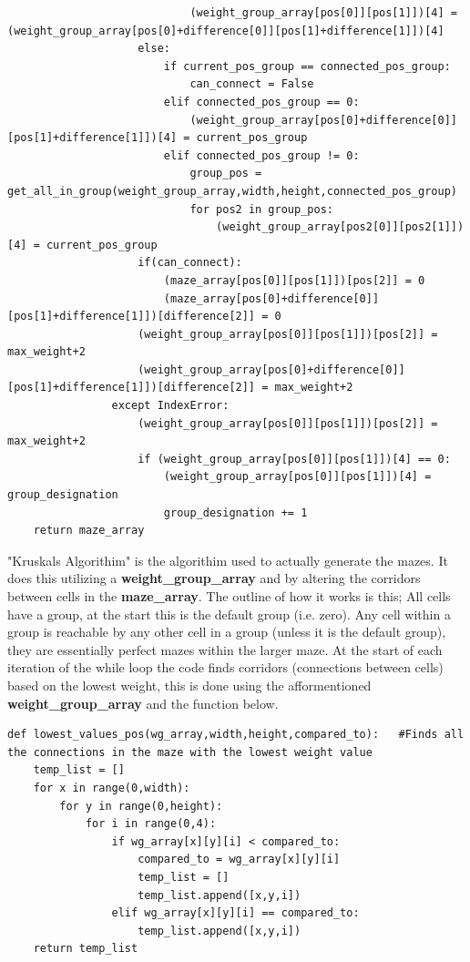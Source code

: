 \begin{lstlisting}
                            (weight_group_array[pos[0]][pos[1]])[4] = (weight_group_array[pos[0]+difference[0]][pos[1]+difference[1]])[4]
                    else:
                        if current_pos_group == connected_pos_group:
                            can_connect = False
                        elif connected_pos_group == 0:
                            (weight_group_array[pos[0]+difference[0]][pos[1]+difference[1]])[4] = current_pos_group
                        elif connected_pos_group != 0:
                            group_pos = get_all_in_group(weight_group_array,width,height,connected_pos_group)
                            for pos2 in group_pos:
                                (weight_group_array[pos2[0]][pos2[1]])[4] = current_pos_group
                    if(can_connect):
                        (maze_array[pos[0]][pos[1]])[pos[2]] = 0
                        (maze_array[pos[0]+difference[0]][pos[1]+difference[1]])[difference[2]] = 0
                    (weight_group_array[pos[0]][pos[1]])[pos[2]] = max_weight+2
                    (weight_group_array[pos[0]+difference[0]][pos[1]+difference[1]])[difference[2]] = max_weight+2
                except IndexError:
                    (weight_group_array[pos[0]][pos[1]])[pos[2]] = max_weight+2
                    if (weight_group_array[pos[0]][pos[1]])[4] == 0:
                        (weight_group_array[pos[0]][pos[1]])[4] = group_designation
                        group_designation += 1
    return maze_array
\end{lstlisting}
"Kruskals Algorithim" is the algorithim used to actually generate the mazes. It does this utilizing a \textbf{weight\_group\_array} and by altering
the corridors between cells in the \textbf{maze\_array}. The outline of how it works is this; All cells have a group, at the start this is the default group (i.e. zero).
Any cell within a group is reachable by any other cell in a group (unless it is the default group), they are essentially perfect mazes within the larger maze.
At the start of each iteration of the while loop the code finds corridors (connections between cells) based on the lowest weight, this is done using the afformentioned
\textbf{weight\_group\_array} and the function below.
\clearpage
\begin{lstlisting}
def lowest_values_pos(wg_array,width,height,compared_to):   #Finds all the connections in the maze with the lowest weight value
    temp_list = []
    for x in range(0,width):
        for y in range(0,height):
            for i in range(0,4):
                if wg_array[x][y][i] < compared_to:
                    compared_to = wg_array[x][y][i]
                    temp_list = []
                    temp_list.append([x,y,i])
                elif wg_array[x][y][i] == compared_to:
                    temp_list.append([x,y,i])
    return temp_list
\end{lstlisting}
